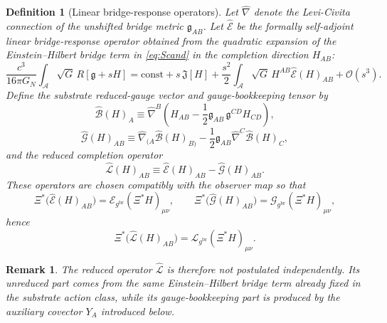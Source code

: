 \documentclass[11pt]{article}
\newcommand{\Sub}{\mathcal A}
\newcommand{\ObserverMap}{\Xi}
\newcommand{\BridgeMetric}{\mathfrak g}
\newcommand{\ObserverMetric}{g^{\mathrm{br}}}
\newcommand{\SubEinLin}{\widehat{\mathcal E}}
\newcommand{\SubGaugeVec}{\widehat{\mathcal B}}
\newcommand{\SubGaugeBook}{\widehat{\mathcal G}}
\newcommand{\SubReducedEin}{\widehat{\mathcal L}}
\newcommand{\GaugeAux}{Y}
\newcommand{\ReducedEin}{\mathcal L_{\ObserverMetric}}
\newcommand{\GaugeBook}{\mathcal G_{\ObserverMetric}}
\newcommand{\EinLin}{\mathcal E_{\ObserverMetric}}
\newtheorem{definition}{Definition}
\newtheorem{remark}{Remark}
\begin{document}
\begin{definition}[Linear bridge-response operators]
\label{def:operators}
Let \(\widehat\nabla\) denote the Levi-Civita connection of the unshifted bridge metric \(\BridgeMetric_{AB}\). Let \(\SubEinLin\) be the formally self-adjoint linear bridge-response operator obtained from the quadratic expansion of the Einstein--Hilbert bridge term in \eqref{eq:Scand} in the completion direction \(H_{AB}\):
\begin{equation}
\frac{c^3}{16\pi G_N}
\int_{\Sub}\sqrt{G}\,R[\BridgeMetric+sH]
=
\mathrm{const}
+s\,\mathfrak J[H]
+\frac{s^2}{2}\int_{\Sub}\sqrt{G}\,H^{AB}\SubEinLin(H)_{AB}
+\mathcal O(s^3).
\label{eq:quadEH}
\end{equation}
Define the substrate reduced-gauge vector and gauge-bookkeeping tensor by
\begin{equation}
\SubGaugeVec(H)_A
\equiv
\widehat\nabla^B\!\left(
H_{AB}
-\frac12 \BridgeMetric_{AB}\,\BridgeMetric^{CD}H_{CD}
\right),
\label{eq:subB}
\end{equation}
\begin{equation}
\SubGaugeBook(H)_{AB}
\equiv
\widehat\nabla_{(A}\SubGaugeVec(H)_{B)}
-\frac12 \BridgeMetric_{AB}\widehat\nabla^C\SubGaugeVec(H)_C,
\label{eq:subG}
\end{equation}
and the reduced completion operator
\begin{equation}
\SubReducedEin(H)_{AB}
\equiv
\SubEinLin(H)_{AB}-\SubGaugeBook(H)_{AB}.
\label{eq:subL}
\end{equation}
These operators are chosen compatibly with the observer map so that
\begin{equation}
\ObserverMap^*\bigl(\SubEinLin(H)_{AB}\bigr)
=
\EinLin(\ObserverMap^*H)_{\mu\nu},
\qquad
\ObserverMap^*\bigl(\SubGaugeBook(H)_{AB}\bigr)
=
\GaugeBook(\ObserverMap^*H)_{\mu\nu},
\label{eq:intertwiners}
\end{equation}
hence
\begin{equation}
\ObserverMap^*\bigl(\SubReducedEin(H)_{AB}\bigr)
=
\ReducedEin(\ObserverMap^*H)_{\mu\nu}.
\label{eq:intertwineL}
\end{equation}
\end{definition}

\begin{remark}
The reduced operator \(\SubReducedEin\) is therefore not postulated independently. Its unreduced part comes from the same Einstein--Hilbert bridge term already fixed in the substrate action class, while its gauge-bookkeeping part is produced by the auxiliary covector \(\GaugeAux_A\) introduced below.
\end{remark}
\end{document}
